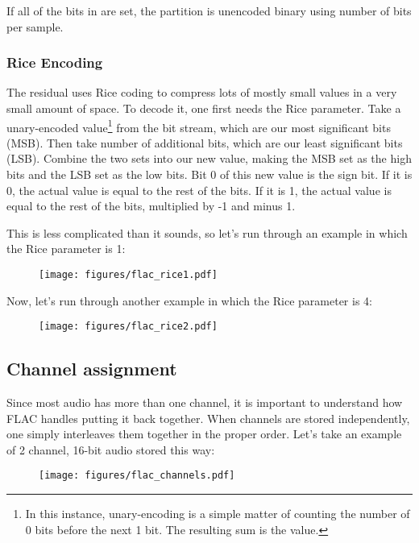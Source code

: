 If all of the bits in  are set,
the partition is unencoded binary using  number of bits per
sample.

\pagebreak

\subsubsection{Rice Encoding}
The residual uses Rice coding to compress lots of mostly small values
in a very small amount of space.
To decode it, one first needs the Rice parameter.
Take a unary-encoded value\footnote{In this instance, unary-encoding is a simple matter of
counting the number of 0 bits before the next 1 bit.
The resulting sum is the value.}
from the bit stream, which are our most
significant bits (MSB).
Then take  number of additional bits, which are our least
significant bits (LSB).
Combine the two sets into our new value,
making the MSB set as the high bits and the LSB set as the low bits.
Bit 0 of this new value is the sign bit.
If it is 0, the actual value is equal to the rest of the bits.
If it is 1, the actual value is equal to the rest of the bits,
multiplied by -1 and minus 1.

This is less complicated than it sounds, so let's run through an example
in which the Rice parameter is 1:
\begin{figure}[h]
\texttt{[image: figures/flac\_rice1.pdf]}
\end{figure}

Now, let's run through another example in which the Rice parameter is 4:
\begin{figure}[h]
\texttt{[image: figures/flac\_rice2.pdf]}
\end{figure}

\pagebreak

\subsection{Channel assignment}
\label{flac_channels}
Since most audio has more than one channel, it is important to
understand how FLAC handles putting it back together.
When channels are stored independently, one simply interleaves
them together in the proper order.
Let's take an example of 2 channel, 16-bit audio stored this way:

\begin{figure}[h]
\texttt{[image: figures/flac\_channels.pdf]}
\end{figure}

